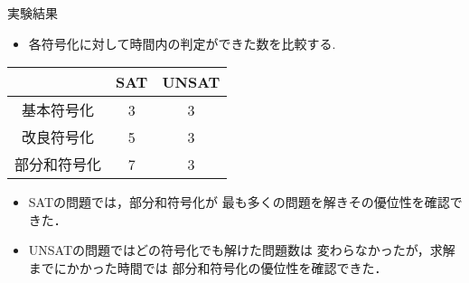 \begin{frame}{実験結果}
 \begin{itemize}
  \item 各符号化に対して時間内の判定ができた数を比較する.
 \end{itemize}
 \begin{block}{}
  \begin{table}[ht]
   \centering
   \begin{tabular}{c|c|c}
    &SAT &UNSAT \\ \hline
    基本符号化 &3 &3 \\
    改良符号化 &5 &3 \\
    部分和符号化 &{\color{red}7} &3 \\ \hline
   \end{tabular}
  \end{table}
  \begin{itemize}
   \item {\sf SAT}の問題では，部分和符号化が
	 最も多くの問題を解きその優位性を確認できた．
   \item {\sf UNSAT}の問題ではどの符号化でも解けた問題数は
	 変わらなかったが，求解までにかかった時間では
	 部分和符号化の優位性を確認できた．
  \end{itemize}
 \end{block}
\end{frame}

\backupend